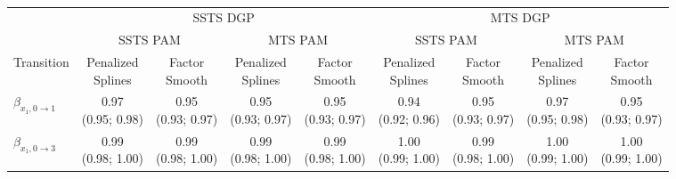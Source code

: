 \begin{table*}[htbp]
\centering
\caption{\captionfecoverage}
\label{tab:sim-ts-fe-coverage}
\begin{sideways}
\footnotesize
\setlength{\tabcolsep}{3pt}
\begin{tabular}{lcccccccc}
\toprule
& \multicolumn{4}{c}{SSTS DGP} & \multicolumn{4}{c}{MTS DGP} \\
\cmidrule(lr){2-5} \cmidrule(lr){6-9}
& \multicolumn{2}{c}{SSTS PAM} & \multicolumn{2}{c}{MTS PAM} & \multicolumn{2}{c}{SSTS PAM} & \multicolumn{2}{c}{MTS PAM} \\
\cmidrule(lr){2-3} \cmidrule(lr){4-5} \cmidrule(lr){6-7} \cmidrule(lr){8-9}
Transition & \shortstack[c]{Penalized\\Splines} & \shortstack[c]{Factor\\Smooth} & \shortstack[c]{Penalized\\Splines} & \shortstack[c]{Factor\\Smooth} & \shortstack[c]{Penalized\\Splines} & \shortstack[c]{Factor\\Smooth} & \shortstack[c]{Penalized\\Splines} & \shortstack[c]{Factor\\Smooth} \\
\midrule
$\beta_{x_1,0\rightarrow 1}$ & \makecell[t]{0.97\\(0.95; 0.98)} & \makecell[t]{0.95\\(0.93; 0.97)} & \makecell[t]{0.95\\(0.93; 0.97)} & \makecell[t]{0.95\\(0.93; 0.97)} & \makecell[t]{0.94\\(0.92; 0.96)} & \makecell[t]{0.95\\(0.93; 0.97)} & \makecell[t]{0.97\\(0.95; 0.98)} & \makecell[t]{0.95\\(0.93; 0.97)} \\
$\beta_{x_1,0\rightarrow 3}$ & \makecell[t]{0.99\\(0.98; 1.00)} & \makecell[t]{0.99\\(0.98; 1.00)} & \makecell[t]{0.99\\(0.98; 1.00)} & \makecell[t]{0.99\\(0.98; 1.00)} & \makecell[t]{1.00\\(0.99; 1.00)} & \makecell[t]{0.99\\(0.98; 1.00)} & \makecell[t]{1.00\\(0.99; 1.00)} & \makecell[t]{1.00\\(0.99; 1.00)} \\

\end{tabular}
\end{sideways}
\end{table*}
